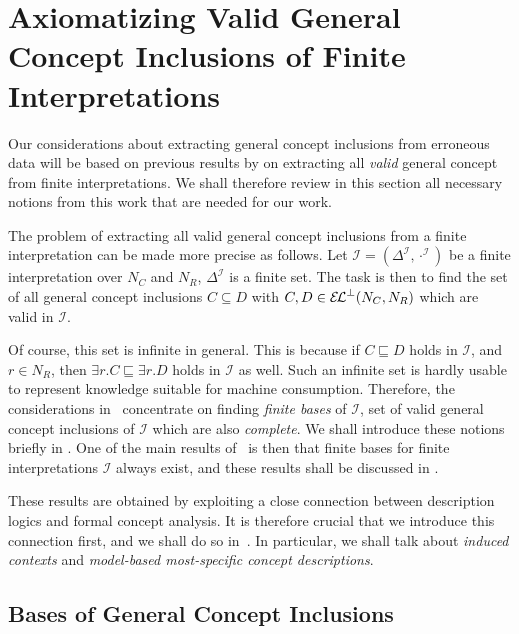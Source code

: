 \chapter{Axiomatizing Valid General Concept Inclusions of Finite Interpretations}
\label{cha:axiom-valid-el}

Our considerations about extracting general concept inclusions from erroneous data will be
based on previous results by \textcite{Diss-Felix} on extracting all \emph{valid} general
concept from finite interpretations.  We shall therefore review in this section all
necessary notions from this work that are needed for our work.

The problem of extracting all valid general concept inclusions from a finite
interpretation can be made more precise as follows.  Let $\mathcal{I} =
(\Delta^{\mathcal{I}}, \cdot^{\mathcal{I}})$ be a finite interpretation over $N_C$ and
$N_R$, \ie $\Delta^{\mathcal{I}}$ is a finite set.  The task is then to find the set of
all general concept inclusions $C \subseteq D$ with $C, D \in {\ensuremath{{\mathcal{E}\kern-.3ex\mathcal{L}}^\bot}}(N_C, N_R)$ which are
valid in $\mathcal{I}$.

Of course, this set is infinite in general.  This is because if $C \sqsubseteq D$ holds in
$\mathcal{I}$, and $r \in N_R$, then $\exists r. C \sqsubseteq \exists r. D$ holds in
$\mathcal{I}$ as well.  Such an infinite set is hardly usable to represent knowledge
suitable for machine consumption.  Therefore, the considerations in~\cite{Diss-Felix}
concentrate on finding \emph{finite bases} of $\mathcal{I}$, \ie set of valid general
concept inclusions of $\mathcal{I}$ which are also \emph{complete}.  We shall introduce
these notions briefly in .  One of the main results
of~\cite{Diss-Felix} is then that finite bases for finite interpretations $\mathcal{I}$
always exist, and these results shall be discussed in .

These results are obtained by exploiting a close connection between description logics and
formal concept analysis.  It is therefore crucial that we introduce this connection first,
and we shall do so in~.  In particular, we shall talk about
\emph{induced contexts} and \emph{model-based most-specific concept descriptions}.

\section{Bases of General Concept Inclusions}
\label{sec:bases-gener-conc}

